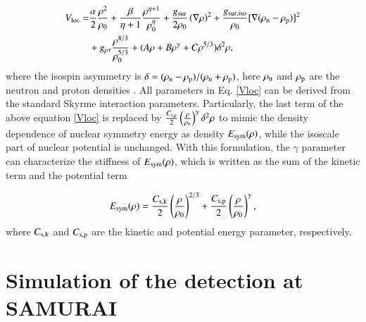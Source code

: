 \documentclass[twocolumn,twoside,showpacs,showkeys,preprintnumbers,superscriptaddress,amsmath,amssymb,prc,nofootinbib,a4paper]{revtex4}
\begin{document}
 \begin{align}\label{Vloc}
 V_{\rm loc}=&\frac{\alpha}{2}\frac{\rho ^{2}}{\rho _{0}}+\frac{\beta }{\eta +1}%
 \frac{\rho ^{\eta +1}}{\rho _{0}^{\eta }}
 +\frac{g_{\rm sur}}{2\rho _{0}}\left(\nabla \rho \right)^{2}
 +\frac{g_{\rm sur,iso}}{\rho_{0}}[\nabla(\rho_{\rm n}-\rho_{\rm p})]^{2}\nonumber\\
 &+g_{\rho\tau}\frac{\rho^{8/3}}{\rho_{0}^{5/3}}+(A\rho+B\rho^{\gamma}+C\rho^{5/3})\delta^{2}\rho,
 \end{align}
 where the isospin asymmetry is $\delta = (\rho_{\rm n} -\rho_{\rm p})/(\rho_{\rm n} +\rho_{\rm p})$, here $\rho_{\rm n}$ and $\rho_{\rm p}$ are the neutron and proton densities \cite{ou2008dynamical}. All parameters in Eq. \ref{Vloc} can be derived from the standard Skyrme interaction parameters. Particularly, the last term of the above equation \ref{Vloc} is replaced by  $\textstyle{C_{\rm s,p}\over 2}\left( \textstyle{\rho \over \rho_0} \right)^{\gamma}\delta^{2}\rho$ to mimic the density dependence of nuclear symmetry energy as density $E_{\rm sym}(\rho)$, while the isoscale part of nuclear potential is unchanged.  With this formulation, the $\gamma$ parameter can characterize the stiffness of $E_{\rm sym}(\rho)$, which  is written as the sum of the kinetic term and the potential term

    \begin{align}
       E_{\rm sym}(\rho)=\frac{C_{\rm s,k}}{2} \left(\frac{\rho}{\rho_0} \right)^{2/3}+ \frac{C_{\rm s,p}}{2} \left(\frac{\rho}{\rho_0} \right)^{\gamma},
       \label{Esymwithgamma}
    \end{align}
where $C_{\rm s,k}$ and $C_{\rm s,p}$ are the kinetic and potential energy parameter, respectively. 


\section{Simulation of the detection at SAMURAI}

\label{sec:AngDistribution}
\end{document}
